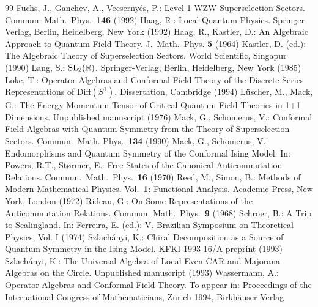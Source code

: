 \documentclass[10pt,a4paper]{article}
\begin{document}
\begin{thebibliography}{99}
 Fuchs, J., Ganchev, A., Vecserny{\'e}s, P.:
Level 1 WZW Superselection Sectors.
Commun. Math.~Phys.~{\bf 146} (1992)
 Haag, R.: Local Quantum Physics.
Springer-Verlag, Berlin, Heidelberg, New York (1992)
 Haag, R., Kastler, D.: An Algebraic Approach
to Quantum Field Theory. J.~Math.~Phys. {\bf 5} (1964)
 Kastler, D. (ed.):  The Algebraic
Theory of Superselection Sectors. World Scientific,
Singapur (1990)
 Lang, S.: ${\rm SL}_2(\mathbb{R})$.
Springer-Verlag, Berlin, Heidelberg, New York (1985)
 Loke, T.: Operator Algebras and
Conformal Field Theory of the Discrete Series
Representations of Diff$(S^1)$. Dissertation,
Cambridge (1994)
 L{\"u}scher, M., Mack, G.:  The
Energy Momentum Tensor of Critical Quantum Field Theories
in 1+1 Dimensions. Unpublished manuscript (1976)
 Mack, G., Schomerus, V.: Conformal
Field Algebras with Quantum Symmetry from the Theory of
Superselection Sectors. Commun.~Math. Phys.~{\bf 134} (1990)
 Mack, G., Schomerus, V.:
Endomorphisms and Quantum Symmetry of the Conformal
Ising Model. In: \cite{Kast}
 Powers, R.T., St{\o}rmer, E.: Free
States of the Canonical Anticommutation Relations.
Commun.~Math.~Phys.~{\bf 16} (1970)
 Reed, M., Simon, B.: Methods of Modern
Mathematical Physics. Vol.~{\bf 1}: Functional
Analysis. Academic Press, New York, London (1972)
 Rideau, G.: On Some Representations
of the Anticommutation Relations.
Commun. Math.~Phys.~{\bf 9} (1968)
 Schroer, B.: A Trip to
Scalingland. In: Ferreira, E. (ed.): V. Brazilian
Symposium on Theoretical Physics, Vol. I (1974)
 Szlach\'{a}nyi, K.: Chiral
Decomposition as a Source of Quantum Symmetry in the
Ising Model. KFKI-1993-16/A preprint (1993)
 Szlach\'{a}nyi, K.: The Universal Algebra
of Local Even CAR and Majorana Algebras on the Circle.
Unpublished manuscript (1993)
 Wassermann, A.: Operator Algebras and
Conformal Field Theory. To appear in: Proceedings of
the International Congress of Mathematicians,
Z{\"u}rich 1994, Birkh{\"a}user Verlag
\end{thebibliography}
\end{document}
